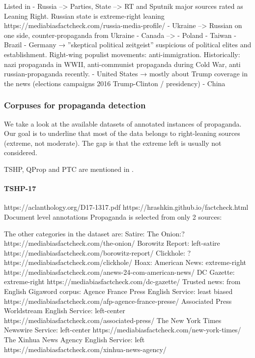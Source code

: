 Listed in \cite{woolley2018computational}
- Russia --> Parties, State --> RT and Sputnik major sources rated as Leaning Right. Russian state is extreme-right leaning https://mediabiasfactcheck.com/russia-media-profile/
- Ukraine --> Russian on one side, counter-propaganda from Ukraine
- Canada --> 
- Poland
- Taiwan
- Brazil
- Germany → ”skeptical political zeitgeist” suspicious of political elites and establishment. Right-wing populist movements: anti-immigration. Historically: nazi propaganda in WWII, anti-communist propaganda during Cold War, anti russian-propaganda recently.
- United States → mostly about Trump coverage in the news (elections campaigns 2016 Trump-Clinton / presidency)
- China



\subsubsection{Corpuses for propaganda detection}

We take a look at the available datasets of annotated instances of propaganda.
Our goal is to underline that most of the data belongs to right-leaning sources (extreme, not moderate).
The gap is that the extreme left is usually not considered.

TSHP, QProp and PTC are mentioned in \cite{da2020survey}.


\paragraph{TSHP-17}
https://aclanthology.org/D17-1317.pdf  https://hrashkin.github.io/factcheck.html
Document level annotations
Propaganda is selected from only 2 sources:


The other categories in the dataset are:
Satire:
The Onion:?  https://mediabiasfactcheck.com/the-onion/ 
Borowitz Report: left-satire https://mediabiasfactcheck.com/borowitz-report/ 
Clickhole: ? https://mediabiasfactcheck.com/clickhole/ 
Hoax:
American News: extreme-right https://mediabiasfactcheck.com/anews-24-com-american-news/ 
DC Gazette: extreme-right https://mediabiasfactcheck.com/dc-gazette/ 
Trusted news: from English Gigaword corpus:
Agence France Press English Service: least biased https://mediabiasfactcheck.com/afp-agence-france-presse/ 
Associated Press Worldstream English Service: left-center https://mediabiasfactcheck.com/associated-press/ 
The New York Times Newswire Service: left-center https://mediabiasfactcheck.com/new-york-times/ 
The Xinhua News Agency English Service: left https://mediabiasfactcheck.com/xinhua-news-agency/ 


